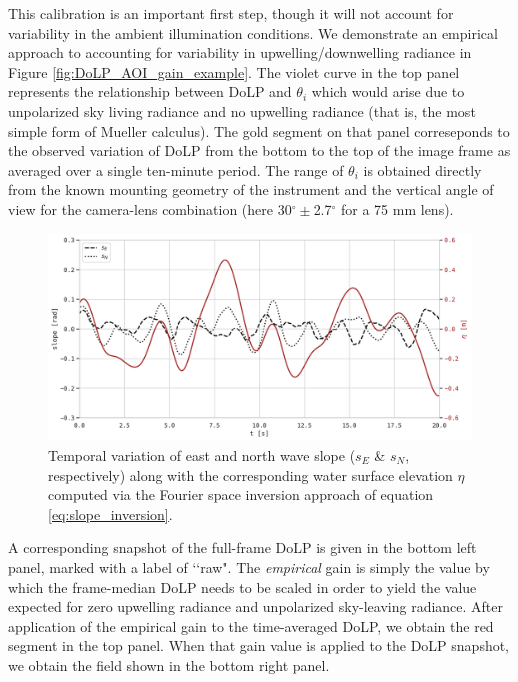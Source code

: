 \documentclass[letterpaper,journal]{IEEEtran}
\begin{document}
This calibration is an important first step, though it will not account for variability in the ambient illumination conditions. We demonstrate an empirical approach to accounting for variability in upwelling/downwelling radiance in Figure \ref{fig:DoLP_AOI_gain_example}. The violet curve in the top panel represents the relationship between DoLP and $\theta_i$ which would arise due to unpolarized sky living radiance and no upwelling radiance (that is, the most simple form of Mueller calculus). The gold segment on that panel correseponds to the observed variation of DoLP from the bottom to the top of the image frame as averaged over a single ten-minute period. The range of $\theta_i$ is obtained directly from the known mounting geometry of the instrument and the vertical angle of view for the camera-lens combination (here 30$^{\circ}\pm$2.7$^{\circ}$ for a 75 mm lens).

\begin{figure}[!ht]
    \centering
    \includegraphics[width=\textwidth]{_figures/wave_slope_elev_timeseries.pdf}
    \vspace{-20pt}
\caption{Temporal variation of east and north wave slope ($s_E$ \& $s_N$, respectively) along with the corresponding water surface elevation $\eta$ computed via the Fourier space inversion approach of equation \ref{eq:slope_inversion}.}
\vspace{-15pt}
\label{fig:wave_slope_elev_timeseries}
\end{figure}

A corresponding snapshot of the full-frame DoLP is given in the bottom left panel, marked with a label of \lq\lq raw". The \emph{empirical} gain is simply the value by which the frame-median DoLP needs to be scaled in order to yield the value expected for zero upwelling radiance and unpolarized sky-leaving radiance. After application of the empirical gain to the time-averaged DoLP, we obtain the red segment in the top panel. When that gain value is applied to the DoLP snapshot, we obtain the field shown in the bottom right panel.
\end{document}
